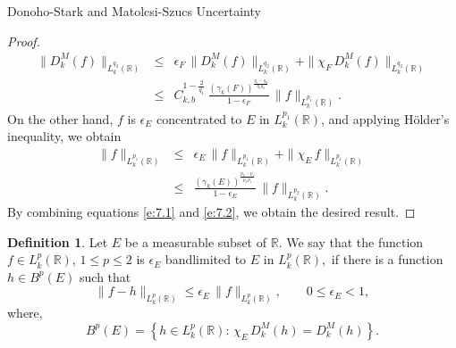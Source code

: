 \documentclass[12pt,a4paper,reqno]{amsproc}
\theoremstyle{definition}
\newtheorem{definition}[theorem]{Definition}
\theoremstyle{remark}
\numberwithin{equation}{section}
\begin{document}
\begin{subsection}{Donoho-Stark and Matolcsi-Szucs Uncertainty}
\begin{proof}
    \begin{eqnarray}\label{e:7.1}
\nonumber \|D_k^M(f)\|_{L_k^{q_2}(\mathbb{R})} &\le& \epsilon_{F}\,  \|D_k^M(f)\|_{L_k^{q_2}(\mathbb{R})} +\| \chi_{F}\,  D_k^M(f)\|_{L_k^{q_2}(\mathbb{R})}\\
 &\le&   C_{k,b}^{1-\frac{2}{q_1}}\, \frac{(\gamma_k(F))^{\frac{q_1-q_2}{q_1q_2}}}{1-\epsilon_{F}}\,\|f\|_{L_k^{p_1}(\mathbb{R})}.   
 \end{eqnarray} 
On the other hand, $f$ is $\epsilon_E$ concentrated to $E$ in $L_k^{p_1}(\mathbb{R})$, and applying H{\"o}lder's inequality, we obtain  
\begin{eqnarray}
\nonumber    \|f\|_{L_k^{p_1}(\mathbb{R})} &\le &\epsilon_E\,\|f\|_{L_k^{p_1}(\mathbb{R})}+\|\chi_E\,f\|_{L_k^{p_1}(\mathbb{R})}\\
 &\le& \frac{(\gamma_k(E))^{\frac{p_2-p_1}{p_2\,p_1}}}{1-\epsilon_E}  \, \|f\|_{L_k^{p_2}(\mathbb{R})}.\label{e:7.2}
\end{eqnarray} 
By combining equations \eqref{e:7.1} and \eqref{e:7.2}, we obtain the desired result. 
\end{proof}
\begin{definition} \label{d:4.14}
    Let $E$ be a measurable subset of $\mathbb{R}$. We say that the function $f\in L_k^p(\mathbb{R})$, $1\le p\le 2 $ is $\epsilon_E$ bandlimited to $E$ in  $L_k^p(\mathbb{R}),$ if there is a function $h\in B^p(E)$ such that 
    \begin{equation*}\label{E:6.3}
        \|f-h\|_{L_k^p(\mathbb{R})} \le \epsilon_E\, \|f\|_{L_k^p(\mathbb{R})}, \qquad 0\le \epsilon_E <1,
    \end{equation*}
    where,
    \begin{equation*}
 B^p(E) = \left\{ h\in L_k^p(\mathbb{R}) :\,\chi_E\, D_k^M(h)= D_k^M(h)\right\} .      
    \end{equation*}
\end{definition}


\end{subsection}
\end{document}
